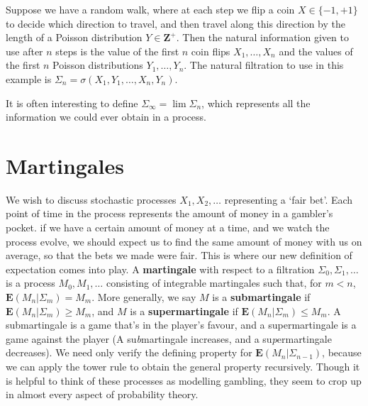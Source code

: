 \begin{example}
    Suppose we have a random walk, where at each step we flip a coin $X \in \{ -1, +1 \}$ to decide which direction to travel, and then travel along this direction by the length of a Poisson distribution $Y \in \mathbf{Z}^+$. Then the natural information given to use after $n$ steps is the value of the first $n$ coin flips $X_1, \dots, X_n$ and the values of the first $n$ Poisson distributions $Y_1, \dots, Y_n$. The natural filtration to use in this example is $\Sigma_n = \sigma(X_1,Y_1, \dots,X_n,Y_n)$.
\end{example}

It is often interesting to define $\Sigma_\infty = \lim \Sigma_n$, which represents all the information we could ever obtain in a process.

\section{Martingales}

We wish to discuss stochastic processes $X_1, X_2, \dots$ representing a `fair bet'. Each point of time in the process represents the amount of money in a gambler's pocket. if we have a certain amount of money at a time, and we watch the process evolve, we should expect us to find the same amount of money with us on average, so that the bets we made were fair. This is where our new definition of expectation comes into play. A {\bf martingale} with respect to a filtration $\Sigma_0, \Sigma_1, \dots$ is a process $M_0, M_1, \dots$ consisting of integrable martingales such that, for $m < n$, $\mathbf{E}(M_n | \Sigma_m) = M_m$. More generally, we say $M$ is a {\bf submartingale} if $\mathbf{E}(M_n|\Sigma_m) \geq M_m$, and $M$ is a {\bf supermartingale} if $\mathbf{E}(M_n|\Sigma_m) \leq M_m$. A submartingale is a game that's in the player's favour, and a supermartingale is a game against the player (A su{\it b}martingale increases, and a su{\it p}ermartingale decreases). We need only verify the defining property for $\mathbf{E}(M_n|\Sigma_{n-1})$, because we can apply the tower rule to obtain the general property recursively. Though it is helpful to think of these processes as modelling gambling, they seem to crop up in almost every aspect of probability theory.

